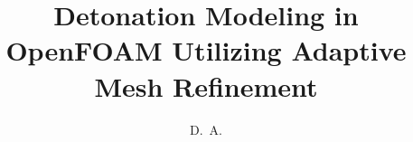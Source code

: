 \documentclass[defaultstyle,12pt]{thesis}
\title{Detonation Modeling in OpenFOAM Utilizing Adaptive Mesh Refinement}
\author{D.~A.}{McGough}
\begin{document}
 




%


\nocite{*}		%

\appendix
%
%
\end{document}
